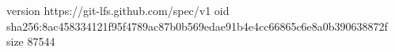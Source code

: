 version https://git-lfs.github.com/spec/v1
oid sha256:8ac458334121f95f4789ac87b0b569edae91b4e4cc66865c6e8a0b390638872f
size 87544
